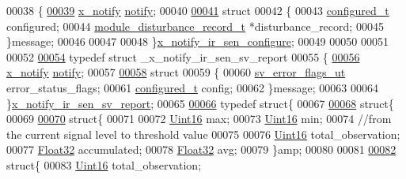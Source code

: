 \begin{DoxyCode}
00038 \{
\hypertarget{a00017_source_l00039}{}\hyperlink{a00017_a8e6a04c2283f9fd7b8dcbc62faba5847}{00039}     \hyperlink{a00036_df/d4c/a00851}{x\_notify}           \hyperlink{a00017_a8e6a04c2283f9fd7b8dcbc62faba5847}{notify};
00040 
\hypertarget{a00017_source_l00041}{}\hyperlink{a00017}{00041}     \textcolor{keyword}{struct}
00042     \{
00043        \hyperlink{a00021_d6/d9c/a00352}{configured\_t}                   configured;
00044        \hyperlink{a00028}{module\_disturbance\_record\_t}   *disturbance\_record;
00045     \}message;
00046 
00047 
00048 \}\hyperlink{a00017_d9/dbb/a00852}{x\_notify\_ir\_sen\_configure};
00049 
00050 
00051 
00052 
\hypertarget{a00017_source_l00054}{}\hyperlink{a00017}{00054} \textcolor{keyword}{typedef} \textcolor{keyword}{struct }\_x\_notify\_ir\_sen\_sv\_report
00055 \{
\hypertarget{a00017_source_l00056}{}\hyperlink{a00017_a8e6a04c2283f9fd7b8dcbc62faba5847}{00056}     \hyperlink{a00036_df/d4c/a00851}{x\_notify}            \hyperlink{a00017_a8e6a04c2283f9fd7b8dcbc62faba5847}{notify};
00057 
\hypertarget{a00017_source_l00058}{}\hyperlink{a00017}{00058}     \textcolor{keyword}{struct}
00059     \{
00060       \hyperlink{a00022_d2/d5a/a00792}{sv\_error\_flags\_ut}      error\_status\_flags;
00061       \hyperlink{a00021_d6/d9c/a00352}{configured\_t}           config;
00062     \}message;
00063 
00064 \}\hyperlink{a00017_d6/d2f/a00854}{x\_notify\_ir\_sen\_sv\_report};
00065 
\hypertarget{a00017_source_l00066}{}\hyperlink{a00017}{00066} \textcolor{keyword}{typedef} \textcolor{keyword}{struct}\{
00067 
\hypertarget{a00017_source_l00068}{}\hyperlink{a00017}{00068}         \textcolor{keyword}{struct}\{
00069        
\hypertarget{a00017_source_l00070}{}\hyperlink{a00017}{00070}         \textcolor{keyword}{struct}\{
00071 
00072         \hyperlink{a00072_a59a9f6be4562c327cbfb4f7e8e18f08b}{Uint16}                 max;
00073         \hyperlink{a00072_a59a9f6be4562c327cbfb4f7e8e18f08b}{Uint16}                 min;
00074         \textcolor{comment}{//from the current signal level to threshold value}
00075         
00076         \hyperlink{a00072_a59a9f6be4562c327cbfb4f7e8e18f08b}{Uint16}                 total\_observation;
00077         \hyperlink{a00072_a87d38f886e617ced2698fc55afa07637}{Float32}                accumulated;
00078         \hyperlink{a00072_a87d38f886e617ced2698fc55afa07637}{Float32}                avg;
00079         \}amp;
00080 
00081 
\hypertarget{a00017_source_l00082}{}\hyperlink{a00017}{00082}         \textcolor{keyword}{struct}\{
00083             \hyperlink{a00072_a59a9f6be4562c327cbfb4f7e8e18f08b}{Uint16}                 total\_observation;

\end{DoxyCode}
